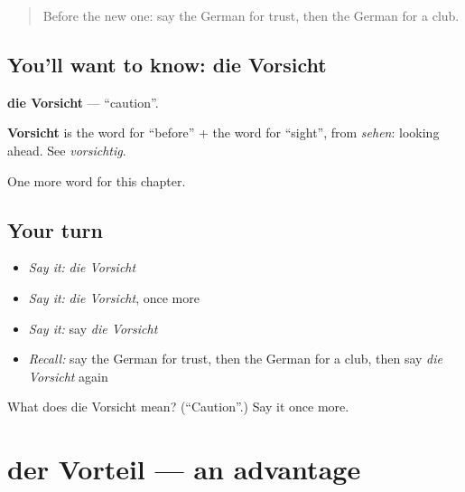 \label{lesson:GE-C242-vorsicht}



\begin{quote}
Before the new one: say the German for trust, then the German for a club.
\end{quote}

\subsection*{You'll want to know: die Vorsicht}
\textbf{die Vorsicht} — \textquotedblleft{}caution\textquotedblright{}.

\begin{cousinweb}
\textbf{Vorsicht} is the word for \textquotedblleft{}before\textquotedblright{} + the word for \textquotedblleft{}sight\textquotedblright{}, from \emph{sehen}: looking ahead. See \emph{vorsichtig}.
\end{cousinweb}

\begin{grammarlens}[title={What you've built}]
One more word for this chapter.
\end{grammarlens}

\subsection*{Your turn}
\begin{itemize}
\raggedright
  \item \emph{Say it:} \emph{die Vorsicht}
  \item \emph{Say it:} \emph{die Vorsicht}, once more
  \item \emph{Say it:} say \emph{die Vorsicht}
  \item \emph{Recall:} say the German for trust, then the German for a club, then say \emph{die Vorsicht} again
\end{itemize}

\begin{tcolorbox}[breakable,colback=teal!4,colframe=teal!35!black,title={Before you move on}]
What does die Vorsicht mean? (\textquotedblleft{}Caution\textquotedblright{}.) Say it once more.
\end{tcolorbox}
\section[der Vorteil]{der Vorteil — an advantage}

\label{lesson:GE-C242-vorteil}



